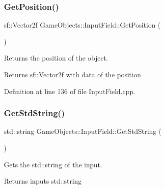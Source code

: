 \subsubsection{\texorpdfstring{GetPosition()}{GetPosition()}}
{\footnotesize\ttfamily sf\+::\+Vector2f Game\+Objects\+::\+Input\+Field\+::\+Get\+Position (\begin{DoxyParamCaption}{ }\end{DoxyParamCaption})}



Returns the position of the object. 

\begin{DoxyReturn}{Returns}
sf\+::\+Vector2f with data of the position \begin{DoxyVerb}\end{DoxyVerb}
 
\end{DoxyReturn}


Definition at line 136 of file Input\+Field.\+cpp.


\begin{DoxyCode}{0}

\end{DoxyCode}
\mbox{\label{class_game_objects_1_1_input_field_a4c67555be1e560afc7974a14e2565c56}} 
\subsubsection{\texorpdfstring{GetStdString()}{GetStdString()}}
{\footnotesize\ttfamily std\+::string Game\+Objects\+::\+Input\+Field\+::\+Get\+Std\+String (\begin{DoxyParamCaption}{ }\end{DoxyParamCaption})}



Gets the std\+::string of the input. 

\begin{DoxyReturn}{Returns}
input\textquotesingle{}s std\+::string \begin{DoxyVerb}\end{DoxyVerb}
 
\end{DoxyReturn}


